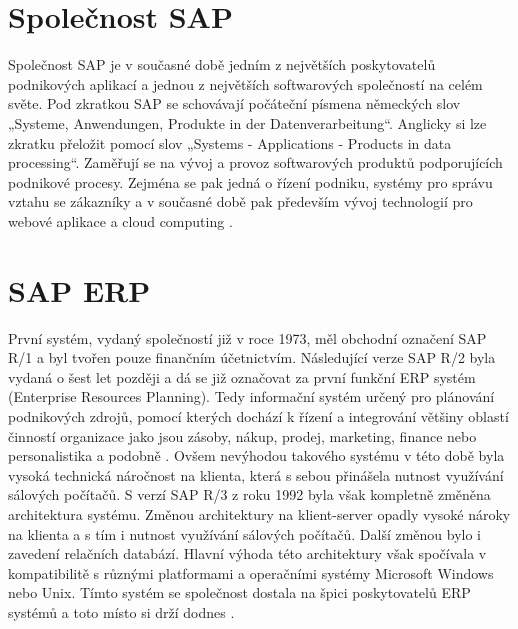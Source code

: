\documentclass[thesis=M,czech]{FITthesis}[2012/06/26]
\begin{document}
\section{Společnost SAP}
Společnost SAP je v současné době jedním z největších poskytovatelů podnikových aplikací a jednou z největších softwarových společností na celém světe. Pod zkratkou SAP se schovávají počáteční písmena německých slov „Systeme, Anwendungen, Produkte in der Datenverarbeitung“. Anglicky si lze zkratku přeložit pomocí slov „Systems - Applications - Products in data processing“. Zaměřují se na vývoj a provoz softwarových produktů podporujících podnikové procesy. Zejména se pak jedná o řízení podniku, systémy pro správu vztahu se zákazníky a v současné době pak především vývoj technologií pro webové aplikace a cloud computing \cite{sap_information}.

\section{SAP ERP}
První systém, vydaný společností již v roce 1973, měl obchodní označení SAP R/1 a byl tvořen pouze finančním účetnictvím. Následující verze SAP R/2 byla vydaná o šest let později a dá se již označovat za první funkční ERP systém (Enterprise Resources Planning). Tedy informační systém určený pro plánování podnikových zdrojů, pomocí kterých dochází k řízení a integrování většiny oblastí činností organizace jako jsou zásoby, nákup, prodej, marketing, finance nebo personalistika a podobně \cite{erpforum_erp_definition}. Ovšem nevýhodou takového systému v této době byla vysoká technická náročnost na klienta, která s sebou přinášela nutnost využívání sálových počítačů. S verzí SAP R/3 z roku 1992 byla však kompletně změněna architektura systému. Změnou architektury na klient-server opadly vysoké nároky na klienta a s tím i nutnost využívání sálových počítačů. Další změnou bylo i zavedení relačních databází. Hlavní výhoda této architektury však spočívala v kompatibilitě s různými platformami a operačními systémy Microsoft Windows nebo Unix. Tímto systém se společnost dostala na špici poskytovatelů ERP systémů a toto místo si drží dodnes \cite{sap_information}.
\end{document}
